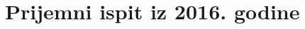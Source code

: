 \documentclass[a4paper,12pt]{report}
\def\dj{d\kern-0.4em\char"16\kern-0.1em}
\begin{document}
\newpage








%
%




\chapter{Prijemni ispit iz 2016. godine}
\end{document}
